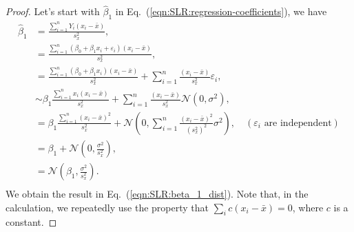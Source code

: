 \documentclass{book}
\begin{document}
\begin{proof}
Let's start with $\hat{\beta}_1$ in Eq.~(\ref{eqn:SLR:regression-coefficients}), we have
\begin{align*}
    \hat{\beta}_1 &= \frac{\sum_{i=1}^n Y_i (x_i - \bar{x})}{s_x^2},\\
    &= \frac{\sum_{i=1}^n (\beta_0 + \beta_1 x_i + \varepsilon_i) (x_i - \bar{x})}{s_x^2},\\
    &= \frac{\sum_{i=1}^n (\beta_0 + \beta_1 x_i) (x_i - \bar{x})}{s_x^2} + \sum_{i=1}^{n} \frac{(x_i - \bar{x})}{s_x^2}\varepsilon_i,\\
    &\sim \beta_1 \frac{\sum_{i=1}^n x_i (x_i - \bar{x})}{s_x^2} + \sum_{i=1}^{n} \frac{(x_i - \bar{x})}{s_x^2}\mathcal{N}(0,\sigma^2),\\
    &= \beta_1 \frac{\sum_{i=1}^n(x_i - \bar{x})^2}{s_x^2} + \mathcal{N}\left(0,\sum_{i = 1}^{n}\frac{(x_i - \bar{x})^2}{(s_x^2)^2}\sigma^2\right),\quad (\varepsilon_i\text{ are independent})\\
    &= \beta_1 + \mathcal{N}\left(0,\frac{\sigma^2}{s_x^2}\right),\\
    &= \mathcal{N}\left(\beta_1, \frac{\sigma^2}{s_x^2}\right).\\
\end{align*}
We obtain the result in Eq.~(\ref{eqn:SLR:beta_1_dist}). Note that, in the calculation, we repeatedly use the property that $\sum_i c(x_i-\bar{x}) = 0$, where $c$ is a constant.


\end{proof}
\end{document}
